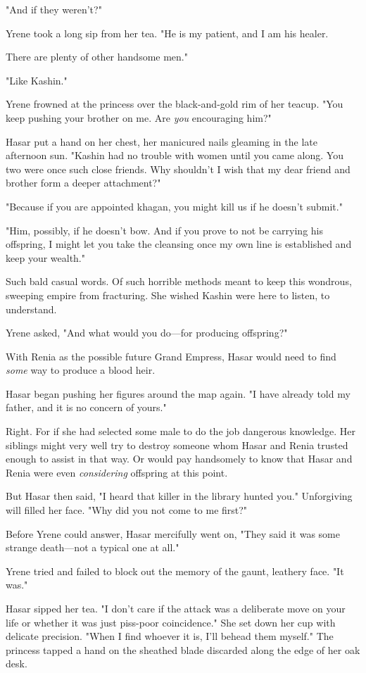 "And if they weren't?"

Yrene took a long sip from her tea.
"He is my patient, and I am his healer.

There are plenty of other handsome men."

"Like Kashin."

Yrene frowned at the princess over the black-and-gold rim of her teacup.
"You keep pushing your brother on me.
Are \emph{you} encouraging him?"

Hasar put a hand on her chest, her manicured nails gleaming in the late afternoon sun.
"Kashin had no trouble with women until you came along.
You two were once such close friends.
Why shouldn't I wish that my dear friend and brother form a deeper attachment?"

"Because if you are appointed khagan, you might kill us if he doesn't submit."

"Him, possibly, if he doesn't bow.
And if you prove to not be carrying his offspring, I might let you take the cleansing once my own line is established and keep your wealth."

Such bald casual words.
Of such horrible methods meant to keep this wondrous, sweeping empire from fracturing.
She wished Kashin were here to listen, to understand.

Yrene asked, "And what would you do---for producing offspring?"

With Renia as the possible future Grand Empress, Hasar would need to find \emph{some} way to produce a blood heir.

Hasar began pushing her figures around the map again.
"I have already told my father, and it is no concern of yours."

Right.
For if she had selected some male to do the job 
dangerous knowledge.
Her siblings might very well try to destroy someone whom Hasar and Renia trusted enough to assist in that way.
Or would pay handsomely to know that Hasar and Renia were even \emph{considering}
offspring at this point.

But Hasar then said, "I heard that killer in the library hunted you."
Unforgiving will filled her face.
"Why did you not come to me first?"

Before Yrene could answer, Hasar mercifully went on, "They said it was some strange death---not a typical one at all."

Yrene tried and failed to block out the memory of the gaunt, leathery face.
"It was."

Hasar sipped her tea.
"I don't care if the attack was a deliberate move on your life or whether it was just piss-poor coincidence."
She set down her cup with delicate precision.
"When I find whoever it is, I'll behead them myself."
The princess tapped a hand on the sheathed blade discarded along the edge of her oak desk.

